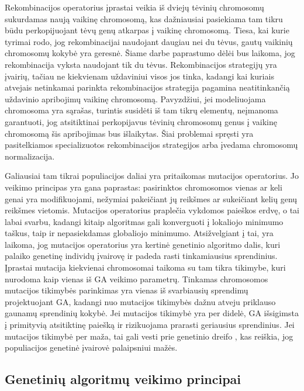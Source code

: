\documentclass{VUMIFInfKursinis}
\begin{document}
Rekombinacijos operatorius įprastai veikia iš dviejų tėvinių chromosomų sukurdamas naują vaikinę chromosomą, kas dažniausiai pasiekiama
tam tikru būdu perkopijuojant tėvų genų atkarpas į vaikinę chromosomą.
Tiesa, kai kurie tyrimai \cite{ting2005mean,eiben1994genetic} rodo, jog rekombinacijai naudojant daugiau nei du tėvus,
gautų vaikinių chromosomų kokybė yra geresnė.
Šiame darbe paprastumo dėlėi bus laikoma, jog rekombinacija vyksta naudojant tik du tėvus.
Rekombinacijos strategijų yra įvairių, tačiau ne kiekvienam uždaviniui visos jos tinka, kadangi
kai kuriais atvejais netinkamai parinkta rekombinacijos strategija pagamina neatitinkančią uždavinio apribojimų vaikinę chromosomą.
Pavyzdžiui, jei modeliuojama chromosoma yra sąrašas, turintis susidėti iš tam tikrų elementų, neįmanoma garantuoti, jog atsitiktinai
perkopijavus tėvinių chromosomų genus į vaikinę chromosomą šis apribojimas bus išlaikytas.
Šiai problemai spręsti yra pasitelkiamos specializuotos rekombinacijos strategijos \cite{larranaga1996learning} arba įvedama chromosomų normalizacija.

Galiausiai tam tikrai populiacijos daliai yra pritaikomas mutacijos operatorius.
Jo veikimo principas yra gana paprastas: pasirinktos chromosomos vienas ar keli genai yra modifikuojami,
nežymiai pakeičiant jų reikšmes ar sukeičiant kelių genų reikšmes vietomis.
Mutacijos operatorius praplečia vykdomos paieškos erdvę, o tai labai svarbu, kadangi kitaip algoritmas gali konverguoti
į lokaliojo minimumo taškus, taip ir nepasiekdamas globaliojo minimumo.
Atsižvelgiant į tai, yra laikoma, jog mutacijos operatorius yra kertinė genetinio algoritmo dalis,
kuri palaiko genetinę individų įvairovę ir padeda rasti tinkamiausius sprendinius.
Įprastai mutacija kiekvienai chromosomai taikoma su tam tikra tikimybe, kuri nurodoma kaip vienas iš GA veikimo parametrų.
Tinkamas chromosomos mutacijos tikimybės parinkimas yra vienas iš svarbiausių sprendimų projektuojant GA,
kadangi nuo mutacijos tikimybės dažnu atveju priklauso gaunamų sprendinių kokybė.
Jei mutacijos tikimybė yra per didelė, GA išsigimsta į primityvią atsitiktinę paiešką \cite{hassanat2019choosing} ir rizikuojama prarasti geriausius sprendinius.
Jei mutacijos tikimybė per maža, tai gali vesti prie genetinio dreifo \cite{masel2011genetic},
kas reiškia, jog populiacijos genetinė įvairovė palaipsniui mažės.

\subsection{Genetinių algoritmų veikimo principai}
\end{document}
